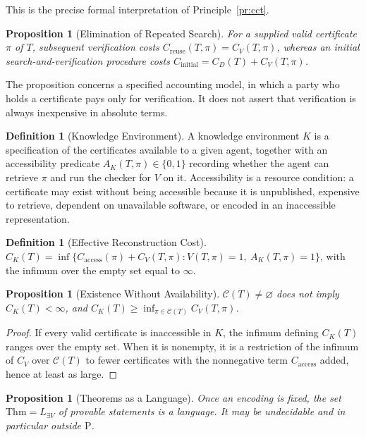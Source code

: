 \documentclass[11pt,letterpaper]{report}
\theoremstyle{plain}
\newtheorem{proposition}[theorem]{Proposition}
\theoremstyle{definition}
\newtheorem{definition}[theorem]{Definition}
\theoremstyle{remark}
\newcommand{\PTIME}{\mathrm{P}}
\begin{document}
This is the precise formal interpretation of Principle~\ref{pr:cct}.

\begin{proposition}[Elimination of Repeated Search]
For a supplied valid certificate $\pi$ of $T$, subsequent verification costs $C_{\mathrm{reuse}}(T,\pi)=C_V(T,\pi)$, whereas an initial search-and-verification procedure costs $C_{\mathrm{initial}}=C_D(T)+C_V(T,\pi)$.
\end{proposition}

The proposition concerns a specified accounting model, in which a party who holds a certificate pays only for verification. It does not assert that verification is always inexpensive in absolute terms.

\begin{definition}[Knowledge Environment]
A knowledge environment $K$ is a specification of the certificates available to a given agent, together with an accessibility predicate $A_K(T,\pi)\in\{0,1\}$ recording whether the agent can retrieve $\pi$ and run the checker for $V$ on it. Accessibility is a resource condition: a certificate may exist without being accessible because it is unpublished, expensive to retrieve, dependent on unavailable software, or encoded in an inaccessible representation.
\end{definition}

\begin{definition}[Effective Reconstruction Cost]
$C_K(T)=\inf\{C_{\mathrm{access}}(\pi)+C_V(T,\pi):V(T,\pi)=1,\ A_K(T,\pi)=1\}$, with the infimum over the empty set equal to $\infty$.
\end{definition}

\begin{proposition}[Existence Without Availability]\label{pr:existnoavail}
$\mathcal C(T)\ne\varnothing$ does not imply $C_K(T)<\infty$, and $C_K(T)\ge\inf_{\pi\in\mathcal C(T)}C_V(T,\pi)$.
\end{proposition}
\begin{proof}
If every valid certificate is inaccessible in $K$, the infimum defining $C_K(T)$ ranges over the empty set. When it is nonempty, it is a restriction of the infimum of $C_V$ over $\mathcal C(T)$ to fewer certificates with the nonnegative term $C_{\mathrm{access}}$ added, hence at least as large.
\end{proof}

\begin{proposition}[Theorems as a Language]
Once an encoding is fixed, the set $\mathrm{Thm}=L_{\exists V}$ of provable statements is a language. It may be undecidable and in particular outside $\PTIME$.
\end{proposition}
\end{document}
